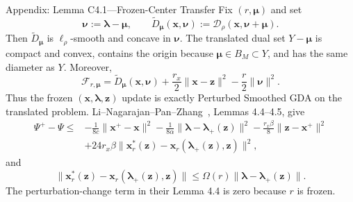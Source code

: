 \documentclass[handout,compress,9pt]{beamer}
\newcommand{\bx}{\bm{x}}
\newcommand{\bz}{\bm{z}}
\newcommand{\bmu}{\bm{\mu}}
\newcommand{\blmbd}{\bm{\lambda}}
\begin{document}
\begin{frame}{Appendix: Lemma C4.1---Frozen-Center Transfer
\hfill\hyperlink{appendix:contents}{}}
\scriptsize
Fix $(r,\bmu)$ and set
\begin{equation*}
  \boldsymbol\nu:=\blmbd-\bmu,
  \qquad
  \widetilde D_{\bmu}(\bx,\boldsymbol\nu)
  :=\mathcal D_\rho(\bx,\boldsymbol\nu+\bmu).
\end{equation*}
Then $\widetilde D_{\bmu}$ is $\ell_\rho$-smooth and concave in
$\boldsymbol\nu$.  The translated dual set $Y-\bmu$ is compact and convex,
contains the origin because $\bmu\in B_M\subset Y$, and has the same diameter
as $Y$.  Moreover,
\begin{equation*}
  \mathcal F_{r,\bmu}
  =\widetilde D_{\bmu}(\bx,\boldsymbol\nu)
  +\frac{r_x}{2}\|\bx-\bz\|^2-\frac r2\|\boldsymbol\nu\|^2.
\end{equation*}
Thus the frozen $(\bx,\blmbd,\bz)$ update is exactly Perturbed Smoothed GDA
on the translated problem.  Li--Nagarajan--Pan--Zhang~{\normalfont[4]},
Lemmas 4.4--4.5, give
\begin{equation*}
\begin{aligned}
  \Psi^+-\Psi\le{}&-\frac1{8c}\|\bx^+-\bx\|^2
  -\frac1{8\alpha}\|\blmbd-\blmbd_+(\bz)\|^2
  -\frac{r_x\beta}{8}\|\bz-\bx^+\|^2\\
  &+24r_x\beta
  \|\bx_r^*(\bz)-\bx_r(\blmbd_+(\bz),\bz)\|^2,
\end{aligned}
\end{equation*}
and
\begin{equation*}
  \|\bx_r^*(\bz)-\bx_r(\blmbd_+(\bz),\bz)\|
  \le\Omega(r)\|\blmbd-\blmbd_+(\bz)\|.
\end{equation*}
The perturbation-change term in their Lemma 4.4 is zero because $r$ is frozen.
\end{frame}
\end{document}
